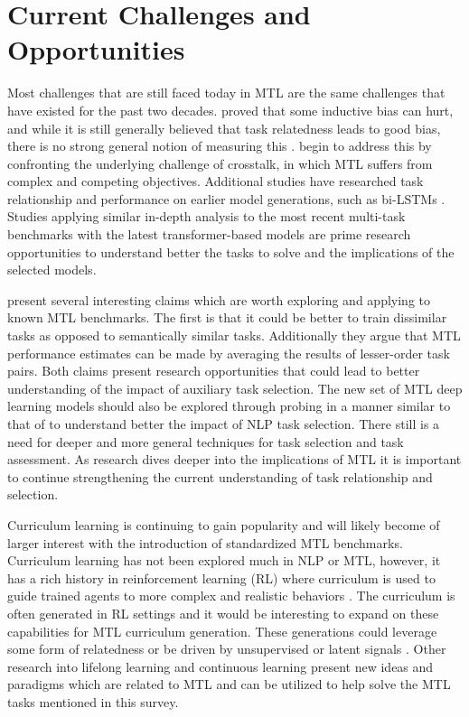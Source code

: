\documentclass[twocolumn]{article}
\begin{document}
\section{Current Challenges and Opportunities}
Most challenges that are still faced today in MTL are the same challenges that have existed for the past two decades. \cite{mtl97} proved that some inductive bias can hurt, and while it is still generally believed that task relatedness leads to good bias, there is no strong general notion of measuring this \citep{notion08,mtloverview17}. \cite{whichtask19} begin to address this by confronting the underlying challenge of crosstalk, in which MTL suffers from complex and competing objectives. Additional studies have researched task relationship and performance on earlier model generations, such as bi-LSTMs \citep{bentask17,mts2sl15,whenmtl17}. Studies applying similar in-depth analysis to the most recent multi-task benchmarks with the latest transformer-based models are prime research opportunities to understand better the tasks to solve and the implications of the selected models.

\cite{whichtask19} present several interesting claims which are worth exploring and applying to known MTL benchmarks. The first is that it could be better to train dissimilar tasks as opposed to semantically similar tasks. Additionally they argue that MTL performance estimates can be made by averaging the results of lesser-order task pairs. Both claims present research opportunities that could lead to better understanding of the impact of auxiliary task selection. The new set of MTL deep learning models should also be explored through probing in a manner similar to that of \cite{probing19} to understand better the impact of NLP task selection. There still is a need for deeper and more general techniques for task selection and task assessment. As research dives deeper into the implications of MTL it is important to continue strengthening the current understanding of task relationship and selection.

Curriculum learning is continuing to gain popularity and will likely become of larger interest with the introduction of standardized MTL benchmarks. Curriculum learning has not been explored much in NLP or MTL, however, it has a rich history in reinforcement learning (RL) where curriculum is used to guide trained agents to more complex and realistic behaviors \citep{curriculum17,soid17}. The curriculum is often generated in RL settings and it would be interesting to expand on these capabilities for MTL curriculum generation. These generations could leverage some form of relatedness \citep{mtdnn19} or be driven by unsupervised or latent signals \citep{task2vec19}. Other research into lifelong learning and continuous learning \citep{neverending18,continuallearning19} present new ideas and paradigms which are related to MTL and can be utilized to help solve the MTL tasks mentioned in this survey.
\end{document}
